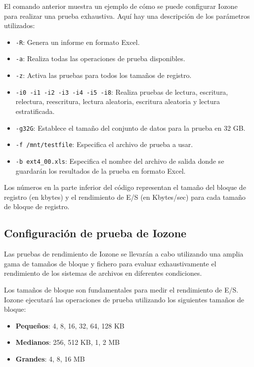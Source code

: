 El comando anterior muestra un ejemplo de cómo se puede configurar Iozone para realizar una prueba exhaustiva. Aquí hay una descripción de los parámetros utilizados:
\begin{itemize}
    \item \texttt{-R}: Genera un informe en formato Excel.
    \item \texttt{-a}: Realiza todas las operaciones de prueba disponibles.
    \item \texttt{-z}: Activa las pruebas para todos los tamaños de registro.
    \item \texttt{-i0 -i1 -i2 -i3 -i4 -i5 -i8}: Realiza pruebas de lectura, escritura, relectura, reescritura, lectura aleatoria, escritura aleatoria y lectura estratificada.
    \item \texttt{-g32G}: Establece el tamaño del conjunto de datos para la prueba en 32 GB.
    \item \texttt{-f /mnt/testfile}: Especifica el archivo de prueba a usar.
    \item \texttt{-b ext4\_00.xls}: Especifica el nombre del archivo de salida donde se guardarán los resultados de la prueba en formato Excel.
\end{itemize}

Los números en la parte inferior del código representan el tamaño del bloque de registro (en kbytes) y el rendimiento de E/S (en Kbytes/sec) para cada tamaño de bloque de registro.\\

\subsection{Configuración de prueba de Iozone}

Las pruebas de rendimiento de Iozone se llevarán a cabo utilizando una amplia gama de tamaños de bloque y fichero para evaluar exhaustivamente el rendimiento de los sistemas de archivos en diferentes condiciones.

\begin{tcolorbox}[title=Tamaños de bloque utilizados, colback=blue!5!white, colframe=gray!75!black]
Los tamaños de bloque son fundamentales para medir el rendimiento de E/S. Iozone ejecutará las operaciones de prueba utilizando los siguientes tamaños de bloque:
\begin{itemize}
    \item \textbf{Pequeños}: 4, 8, 16, 32, 64, 128 KB
    \item \textbf{Medianos}: 256, 512 KB, 1, 2 MB
    \item \textbf{Grandes}: 4, 8, 16 MB
\end{itemize}
\end{tcolorbox}

